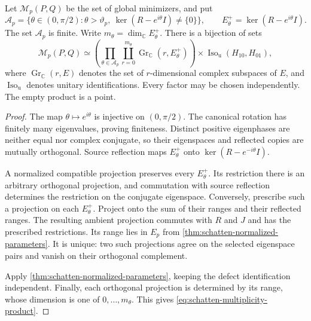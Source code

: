 \begin{theorem}
\label{thm:schatten-multiplicity-parameters}
Let $\mathcal M_p(P,Q)$ be the set of global minimizers, and put
\[
 \mathcal A_p=\{\theta\in(0,\pi/2):\theta>\vartheta_p,
             \ \ker(R-e^{i\theta}I)\ne\{0\}\},\qquad
 E_\theta^+=\ker(R-e^{i\theta}I).
\]
The set $\mathcal A_p$ is finite. Write $m_\theta=\dim_{\mathbb C}E_\theta^+$.
There is a bijection of sets
\begin{equation}
 \mathcal M_p(P,Q)\simeq
 \left(\prod_{\theta\in\mathcal A_p}
    \coprod_{r=0}^{m_\theta}\operatorname{Gr}_{\mathbb C}(r,E_\theta^+)\right)
       \times\operatorname{Iso}_{\mathrm u}(H_{10},H_{01}),
 \label{eq:schatten-multiplicity-product}
\end{equation}
where $\operatorname{Gr}_{\mathbb C}(r,E)$ denotes the set of
$r$-dimensional complex subspaces of $E$, and
$\operatorname{Iso}_{\mathrm u}$ denotes unitary identifications.
Every factor may be chosen independently. The empty product is a point.
\end{theorem}

\begin{proof}
The map $\theta\mapsto e^{i\theta}$ is injective on $(0,\pi/2)$.
The canonical rotation has finitely many eigenvalues, proving finiteness.
Distinct positive eigenphases are neither equal nor complex conjugate,
so their eigenspaces and reflected copies are mutually orthogonal.
Source reflection maps $E_\theta^+$ onto
$\ker(R-e^{-i\theta}I)$.

A normalized compatible projection preserves every $E_\theta^+$.
Its restriction there is an arbitrary orthogonal projection, and
commutation with source reflection determines the restriction on the
conjugate eigenspace. Conversely, prescribe such a projection on each
$E_\theta^+$. Project onto the sum of their ranges and their reflected
ranges. The resulting ambient projection commutes with $R$ and $J$ and
has the prescribed restrictions. Its range lies in $E_p$ from
\cref{thm:schatten-normalized-parameters}. It is unique: two such
projections agree on the selected eigenspace pairs and vanish on their
orthogonal complement.

Apply \cref{thm:schatten-normalized-parameters}, keeping the defect
identification independent. Finally, each orthogonal projection is
determined by its range, whose dimension is one of
$0,\ldots,m_\theta$. This gives \cref{eq:schatten-multiplicity-product}.
\end{proof}

